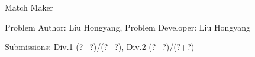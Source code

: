 \begin{Solution}{Match Maker}

\begin{frame}{\ProblemName}

\small Problem Author: Liu Hongyang, Problem Developer: Liu Hongyang \par \vspace{0.3cm}

\small Submissions: Div.1 (?+?)/(?+?), Div.2 (?+?)/(?+?)  \par \vspace{0.5cm}


\end{frame}

\end{Solution}
